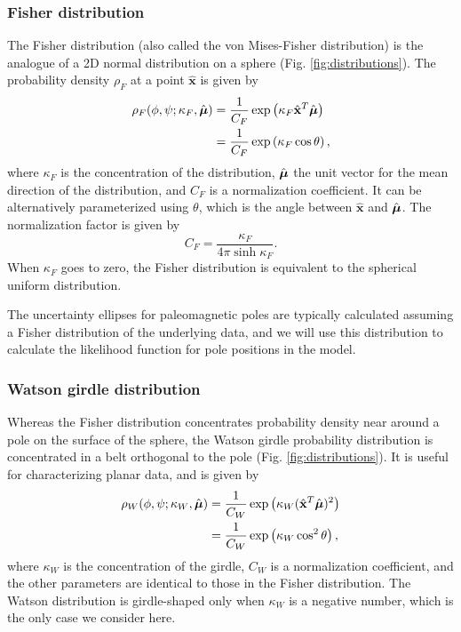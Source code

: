 \documentclass[11pt,letterpaper]{article}
\newcommand{\mitbf}[1]{\hbox{\mathversion{bold}$#1$}}
\begin{document}
\subsubsection*{Fisher distribution}
The Fisher distribution (also called the von Mises-Fisher distribution) is the analogue of a 2D normal distribution on a sphere (Fig. \ref{fig:distributions}). The probability density $\rho_F$ at a point $\hat{\mathbf{x}}$ is given by
\begin{equation}
  \begin{aligned}
  \rho_F(\phi, \psi ; \kappa_F, \hat{\mitbf{\mu}}) 
  &= \frac{1}{C_F} \exp \left( \kappa_F \hat{\mathbf{x}}^T \hat{\mitbf{\mu}} \right) \\
  &= \frac{1}{C_F} \exp \left( \kappa_F \cos \theta \right),
  \end{aligned}
\end{equation}
where $\kappa_F$ is the concentration of the distribution, 
$\hat{\mitbf{\mu}}$ the unit vector for the mean direction of the distribution, 
and $C_F$ is a normalization coefficient. It can be alternatively
parameterized using $\theta$, which is the angle between $\hat{\mathbf{x}}$ and $\hat{\mitbf{\mu}}$.
The normalization factor is given by 
\begin{equation}
  C_F = \frac{\kappa_F}{4 \pi \sinh{\kappa_F}}.
\end{equation}
When $\kappa_F$ goes to zero, the Fisher distribution is equivalent to the spherical uniform distribution.

The uncertainty ellipses for paleomagnetic poles are typically calculated assuming a Fisher distribution of the underlying data, and we will use this distribution to calculate the likelihood function for pole positions in the model.

\subsubsection*{Watson girdle distribution}
Whereas the Fisher distribution concentrates probability density near around a pole on the surface of the sphere, the Watson girdle probability distribution is concentrated in a belt orthogonal to the pole (Fig. \ref{fig:distributions}). It is useful for characterizing planar data, and is given by
\begin{equation}
  \begin{aligned}
  \rho_W(\phi, \psi; \kappa_W, \hat{\mitbf{\mu}}) 
  &= \frac{1}{C_W} \exp \left( \kappa_W (\hat{\mathbf{x}}^T \hat{\mitbf{\mu}})^2 \right) \\
  &= \frac{1}{C_W} \exp \left( \kappa_W \cos^2 \theta \right),
  \end{aligned}
\label{eq:watson}
\end{equation}
where $\kappa_W$ is the concentration of the girdle, $C_W$ is a normalization coefficient, and the other parameters are identical to those in the Fisher distribution. The Watson distribution is girdle-shaped only when $\kappa_W$ is a negative number, which is the only case we consider here.
\end{document}
